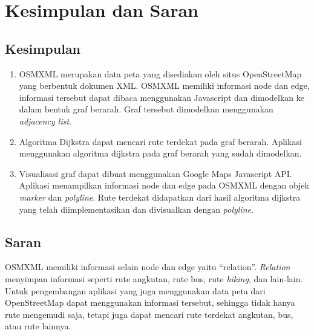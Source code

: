 \chapter{Kesimpulan dan Saran}
\section{Kesimpulan}
\begin{enumerate}
  \item OSMXML merupakan data peta yang disediakan oleh situs OpenStreetMap yang
  berbentuk dokumen XML. OSMXML memiliki informasi node dan edge, informasi
  tersebut dapat dibaca menggunakan Javascript dan dimodelkan ke dalam bentuk
  graf berarah. Graf tersebut dimodelkan menggunakan \textit{adjacency list}.
  
  \item Algoritma Dijkstra dapat mencari rute terdekat pada graf berarah.
  Aplikasi menggunakan algoritma dijkstra pada graf berarah yang sudah
  dimodelkan.
  
  \item Visualisasi graf dapat dibuat menggunakan Google Maps Javascript API.
  Aplikasi menampilkan informasi node dan edge pada OSMXML dengan objek
  \textit{marker} dan \textit{polyline}. Rute terdekat didapatkan dari hasil
  algoritma dijkstra yang telah diimplementasikan dan divisualkan dengan
  \textit{polyline}.
\end{enumerate}

\section{Saran}
OSMXML memiliki informasi selain node dan edge yaitu ``relation''.
\textit{Relation} menyimpan informasi seperti rute angkutan, rute bus, rute
\textit{hiking}, dan lain-lain. Untuk pengembangan aplikasi yang juga
menggunakan data peta dari OpenStreetMap dapat menggunakan informasi tersebut,
sehingga tidak hanya rute mengemudi saja, tetapi juga dapat mencari rute
terdekat angkutan, bus, atau rute lainnya.
